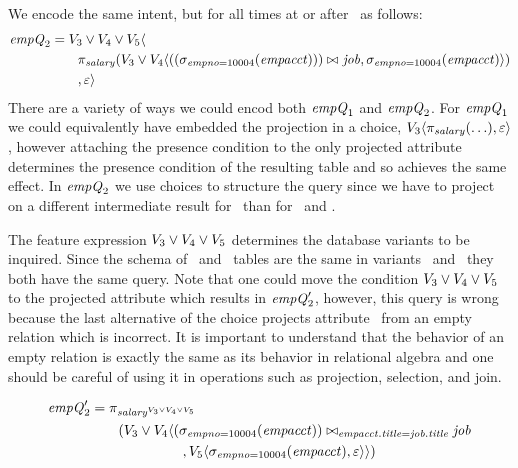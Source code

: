 We encode the same intent, but for all times at or after \vThree\ as follows:
%
\begin{align*}
\eq_2 &=  \vThree\vee\vFour\vee\vFive \langle \\
&\hspace{20pt}\pi_\salary 
 (\vThree\vee\vFour\langle
 \joinRelR{(\vSel[\empno=10004]{(\empacct)})}{\job}
             {}, 
{\vSel[\empno=10004]{(\empacct)}}\rangle)\\
&\hspace{20pt}, \empRel\rangle
\end{align*}
%
\noindent
There are a variety of ways we could encod both $\eq_1$ and $\eq_2$.
%
For $\eq_1$ we could equivalently have embedded the projection in a choice,
$\chc[\vThree]{\vPrj[\salary]{(\ldots)},\empRel}$, however attaching the presence
condition to the only projected attribute determines the presence condition of
the resulting table and so achieves the same effect.
%
In $\eq_2$ we use choices to structure the query since we have to project on a
different intermediate result for \vFive\ than for \vThree\ and \vFour.

 The feature expression $\vThree \vee \vFour \vee \vFive$
 determines the database variants to be inquired. 
 Since the schema of \empacct\ and \job\ tables are the same
 in variants \vThree\ and \vFour\ they both have the same 
 query. Note that one could move the condition 
 $\vThree \vee \vFour \vee \vFive$ to the projected attribute
 which results in $\VVal {\eq_2}$, however, this query is wrong 
 because the last alternative of the choice projects attribute \salary\
 from an empty relation which is incorrect. It is important to 
 understand that the behavior of an empty relation is exactly the
 same as its behavior in relational algebra and one
 should be careful of using it in operations such as projection,
 selection, and join.

 \begin{align*}
 \small
 \VVal {\eq_2} &= 
 \pi_{\oatt \salary {\vThree \vee \vFour \vee \vFive}}\\
 &\qquad
 (\vThree \vee \vFour\langle
 (\sigma_{\empno=10004} {(\empacct)})
 \bowtie_{\empacct . \titleatt = \job . \titleatt}
 \job\\
 &\hspace{66pt},
 \vFive\langle{\selectRel {\empno=10004} {(\empacct)}},
 \empRel
 \rangle
 \rangle)
 \end{align*}

